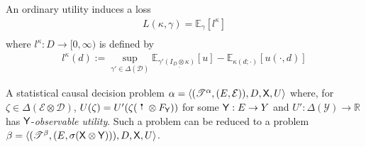 \begin{definition}
An ordinary utility induces a loss
\begin{align}
    L(\kappa,\gamma) = \mathbb{E}_{\gamma}[l^\kappa]\\
\end{align}
where $l^\kappa:D\to [0,\infty)$ is defined by
\begin{align}
    l^\kappa(d) := \sup_{\gamma'\in \Delta(\mathcal{D})} \mathbb{E}_{\gamma'\underline{(I_D\otimes \kappa)}}[u] - \mathbb{E}_{\kappa(d;\cdot)}[u(\cdot,d)]\label{eq:induced_l}
\end{align}
\end{definition}




\begin{theorem}\label{th:scdp_obu_red}
A statistical causal decision problem $\alpha=\langle (\mathscr{T}^\alpha,(E,\mathcal{E})),D,\mathsf{X},U\rangle$ where, for $\zeta\in \Delta(\mathcal{E}\otimes\mathcal{D})$, $U(\zeta)=U'(\zeta (\stopper{0.15} \otimes F_{\RV{Y}}))$ for some $\mathsf{Y}:E\to Y$ and $U':\Delta(\mathcal{Y})\to \mathbb{R}$ has $\mathsf{Y}$-\emph{observable utility}. Such a problem can be reduced to a problem $\beta=\langle (\mathscr{T}^\beta,(E,\sigma(\mathsf{X}\otimes\mathsf{Y}))),D,\mathsf{X},U\rangle$.
\end{theorem}

